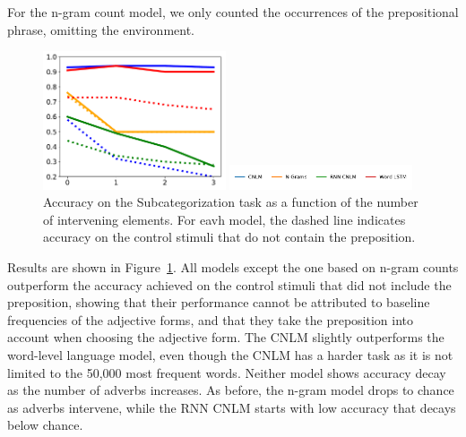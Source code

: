 For the n-gram count model, we only counted the occurrences of the prepositional phrase, omitting the environment.

\begin{figure}
\includegraphics[width=0.48\textwidth]{figures/german-prep-with-control.pdf}

\includegraphics[width=0.48\textwidth]{figures/german-legend.pdf}
\caption{Accuracy on the Subcategorization task as a function of the number of intervening elements. For eavh model, the dashed line indicates accuracy on the control stimuli that do not contain the preposition.}\label{fig:prep}
\end{figure}

Results are shown in Figure~\ref{fig:prep}.
All models except the one based on n-gram counts outperform the accuracy achieved on the control stimuli that did not include the preposition, showing that their performance cannot be attributed to baseline frequencies of the adjective forms, and that they take the preposition into account when choosing the adjective form.
The CNLM slightly outperforms the word-level language model, even though the CNLM has a harder task as it is not limited to the 50,000 most frequent words.
Neither model shows accuracy decay as the number of adverbs increases.
As before, the n-gram model drops to chance as adverbs intervene, while the RNN CNLM starts with low accuracy that decays below chance.





